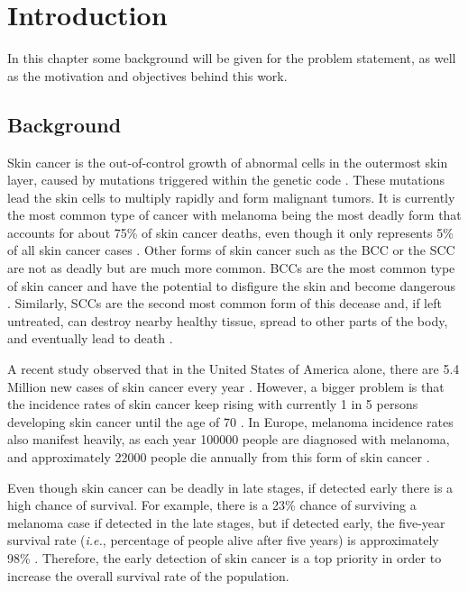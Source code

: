 \chapter{Introduction}
\label{chapter:introduction}

In this chapter some background will be given for the problem statement, as well as the motivation and objectives behind this work.

\section{Background}
    Skin cancer is the out-of-control growth of abnormal cells in the outermost skin layer, caused by mutations triggered within the genetic code \cite{Foundation2019}. These mutations lead the skin cells to multiply rapidly and form malignant tumors. It is currently the most common type of cancer \cite{Rogers2015} with melanoma being the most deadly form that accounts for about 75\% of skin cancer deaths, even though it only represents 5\% of all skin cancer cases \cite{Esteva2017}. Other forms of skin cancer such as the \ac{BCC} or the \ac{SCC} are not as deadly but are much more common. \ac{BCC}s are the most common type of skin cancer and have the potential to disfigure the skin and become dangerous \cite{Rogers2015}. Similarly, \ac{SCC}s are the second most common form of this decease and, if left untreated, can destroy nearby healthy tissue, spread to other parts of the body, and eventually lead to death \cite{Foundation2019}. \par
    
    A recent study observed that in the United States of America alone, there are 5.4 Million new cases of skin cancer every year \cite{Rogers2015}. However, a bigger problem is that the incidence rates of skin cancer keep rising with currently 1 in 5 persons developing skin cancer until the age of 70 \cite{Foundation2019}. In Europe, melanoma incidence rates also manifest heavily, as each year 100000 people are diagnosed with melanoma, and approximately 22000 people die annually from this form of skin cancer \cite{Bray2018}. \par 
    
    Even though skin cancer can be deadly in late stages, if detected early there is a high chance of survival. For example, there is a 23\% chance of surviving a melanoma case if detected in the late stages, but if detected early, the five-year survival rate (\textit{i.e.}, percentage of people alive after five years) is approximately 98\% \cite{Foundation2019}. Therefore, the early detection of skin cancer is a top priority in order to increase the overall survival rate of the population. \par
    
